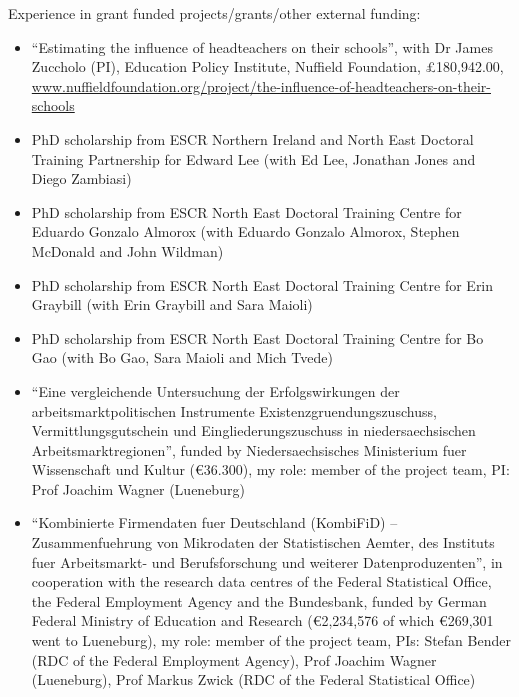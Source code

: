 \documentclass[10pt,pdftex,a4paper,oneside]{article}
\begin{document}
Experience in grant funded projects/grants/other external funding:
\begin{itemize}[noitemsep,nolistsep]
\item [2020-2022]``Estimating the influence of headteachers on their schools'', with Dr James Zuccholo (PI), Education Policy Institute, Nuffield Foundation, {\pounds}180,942.00, \newline   \url{www.nuffieldfoundation.org/project/the-influence-of-headteachers-on-their-schools}
\item[2025-2028] PhD scholarship from ESCR Northern Ireland and North East Doctoral Training Partnership for Edward Lee (with Ed Lee, Jonathan Jones and Diego Zambiasi)
\item[2015-2018] PhD scholarship from ESCR North East Doctoral Training Centre for Eduardo Gonzalo Almorox (with Eduardo Gonzalo Almorox, Stephen McDonald and John Wildman)
\item[2014-2017] PhD scholarship from ESCR North East Doctoral Training Centre for Erin Graybill (with Erin Graybill and Sara Maioli)
\item[2012-2015] PhD scholarship from ESCR North East Doctoral Training Centre for Bo Gao (with Bo Gao, Sara Maioli and Mich Tvede)
\item[2007] ``Eine vergleichende Untersuchung der Erfolgswirkungen der arbeitsmarktpolitischen Instrumente Existenzgruendungszuschuss, Vermittlungsgutschein und Eingliederungszuschuss in
niedersaechsischen Arbeitsmarktregionen'', funded by Niedersaechsisches Ministerium fuer Wissenschaft und Kultur (\euro36.300), my role: member of the project team, PI: Prof Joachim Wagner (Lueneburg)
\item[2007 - 2010] ``Kombinierte Firmendaten fuer Deutschland (KombiFiD) -- Zusammenfuehrung von Mikrodaten der Statistischen Aemter, des Instituts fuer Arbeitsmarkt- und Berufsforschung und weiterer Datenproduzenten'', in cooperation with the research data centres of the Federal Statistical Office, the Federal Employment Agency and the Bundesbank, funded by German Federal Ministry of Education and Research (\euro2,234,576 of which \euro269,301 went to Lueneburg), my role: member of the project team, PIs: Stefan Bender (RDC of the Federal Employment Agency), Prof Joachim Wagner (Lueneburg), Prof Markus Zwick (RDC of the Federal Statistical Office)
\end{itemize}
\end{document}
